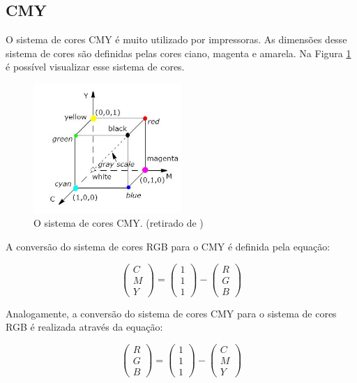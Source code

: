 \documentclass[	12pt, Times, openright, twoside, a4paper, english, brazil]{abntex2}
\begin{document}
\subsection{CMY}
O sistema de cores CMY é muito utilizado por impressoras. As dimensões desse sistema de cores são definidas pelas cores ciano, magenta e amarela. Na Figura \ref{fig:figuraCMY} é possível visualizar esse sistema de cores. 

\begin{figure}[!htb]
\centering \includegraphics[width=0.5\textwidth]{figuraCMY.png}
\caption{O sistema de cores CMY. (retirado de ) \label{fig:figuraCMY}}
\end{figure}

A conversão do sistema de cores RGB para o CMY é definida pela equação:

\begin{equation}
\left(\begin{array}{r}
C\\M\\Y
\end{array}\right)
=
\left(\begin{array}{r}
1\\1\\1
\end{array}\right)
-
\left(\begin{array}{r}
R\\G\\B
\end{array}\right)
\label{eq:CMY}
\end{equation}

Analogamente, a conversão do sistema de cores CMY para o sistema de cores RGB é realizada através da equação:

\begin{equation}
\left(\begin{array}{r}
R\\G\\B
\end{array}\right)
=
\left(\begin{array}{r}
1\\1\\1
\end{array}\right)
-
\left(\begin{array}{r}
C\\M\\Y
\end{array}\right)
\end{equation}
\end{document}
